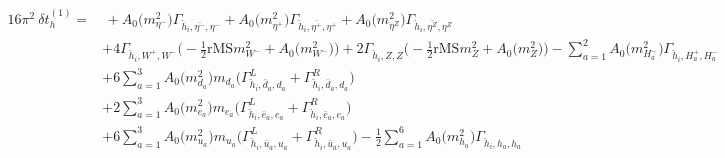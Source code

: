 \begin{align} 
16\pi^2 \ \delta t^{(1)}_{h} = & \, +{A_0\Big(m^2_{\eta^-}\Big)} {\Gamma_{\check{h}_{{i}},\bar{\eta^-},\eta^-}} +{A_0\Big(m^2_{\eta^+}\Big)} {\Gamma_{\check{h}_{{i}},\bar{\eta^+},\eta^+}} +{A_0\Big(m^2_{\eta^Z}\Big)} {\Gamma_{\check{h}_{{i}},\bar{\eta^Z},\eta^Z}} \nonumber \\ 
 &+4 {\Gamma_{\check{h}_{{i}},W^+,W^-}} \Big(-\frac{1}{2} \text{rMS} m^2_{W^-}  + {A_0\Big(m^2_{W^-}\Big)}\Big)+2 {\Gamma_{\check{h}_{{i}},Z,Z}} \Big(-\frac{1}{2} \text{rMS} m^2_{Z}  + {A_0\Big(m^2_{Z}\Big)}\Big)- \sum_{a=1}^{2}{A_0\Big(m^2_{H^-_{{a}}}\Big)} {\Gamma_{\check{h}_{{i}},H^+_{{a}},H^-_{{a}}}}  \nonumber \\ 
 &+6 \sum_{a=1}^{3}{A_0\Big(m^2_{d_{{a}}}\Big)} m_{d_{{a}}} \Big({\Gamma^L_{\check{h}_{{i}},\bar{d}_{{a}},d_{{a}}}} + {\Gamma^R_{\check{h}_{{i}},\bar{d}_{{a}},d_{{a}}}}\Big) \nonumber \\ 
 &+2 \sum_{a=1}^{3}{A_0\Big(m^2_{e_{{a}}}\Big)} m_{e_{{a}}} \Big({\Gamma^L_{\check{h}_{{i}},\bar{e}_{{a}},e_{{a}}}} + {\Gamma^R_{\check{h}_{{i}},\bar{e}_{{a}},e_{{a}}}}\Big) \nonumber \\ 
 &+6 \sum_{a=1}^{3}{A_0\Big(m^2_{u_{{a}}}\Big)} m_{u_{{a}}} \Big({\Gamma^L_{\check{h}_{{i}},\bar{u}_{{a}},u_{{a}}}} + {\Gamma^R_{\check{h}_{{i}},\bar{u}_{{a}},u_{{a}}}}\Big) -\frac{1}{2} \sum_{a=1}^{6}{A_0\Big(m^2_{h_{{a}}}\Big)} {\Gamma_{\check{h}_{{i}},h_{{a}},h_{{a}}}}   
\end{align} 
